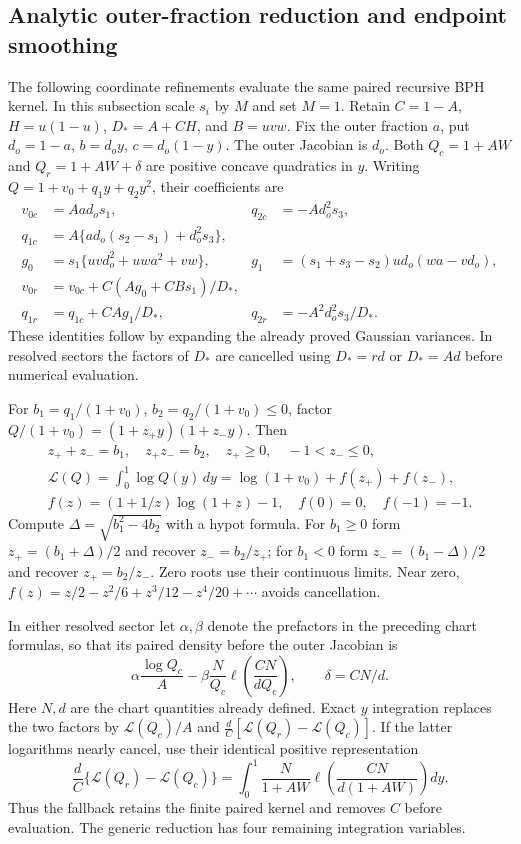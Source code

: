 \subsection{Analytic outer-fraction reduction and endpoint smoothing}
\label{sec:triangle-reduction}

The following coordinate refinements evaluate the same paired recursive BPH
kernel. In this subsection scale $s_i$ by $M$ and set $M=1$. Retain
$C=1-A$, $H=u(1-u)$, $D_*=A+CH$, and $B=uvw$. Fix the outer fraction
$a$, put $d_o=1-a$, $b=d_oy$, $c=d_o(1-y)$. The outer Jacobian is
$d_o$. Both $Q_c=1+AW$ and $Q_r=1+AW+\delta$ are positive concave
quadratics in $y$. Writing $Q=1+v_0+q_1y+q_2y^2$, their coefficients are
\begin{align*}
 v_{0c}&=Aa d_o s_1,& q_{2c}&=-Ad_o^2s_3,\\
 q_{1c}&=A\{a d_o(s_2-s_1)+d_o^2s_3\},&&\\
 g_0&=s_1\{uvd_o^2+uwa^2+vw\},&
 g_1&=(s_1+s_3-s_2)u d_o(wa-vd_o),\\
 v_{0r}&=v_{0c}+C(Ag_0+CBs_1)/D_*,&&\\
 q_{1r}&=q_{1c}+CAg_1/D_*,& q_{2r}&=-A^2d_o^2s_3/D_*.
\end{align*}
These identities follow by expanding the already proved Gaussian variances.
In resolved sectors the factors of $D_*$ are cancelled using $D_*=rd$ or
$D_*=Ad$ before numerical evaluation.

For $b_1=q_1/(1+v_0)$, $b_2=q_2/(1+v_0)\le0$, factor
$Q/(1+v_0)=(1+z_+y)(1+z_-y)$. Then
\begin{gather*}
 z_++z_-=b_1,\quad z_+z_-=b_2,\quad
 z_+\ge0,\quad -1<z_-\le0,\\
 \mathcal L(Q)=\int_0^1\log Q(y)\,dy
   =\log(1+v_0)+f(z_+)+f(z_-),\\
 f(z)=(1+1/z)\log(1+z)-1,\quad f(0)=0,\quad f(-1)=-1.
\end{gather*}
Compute $\Delta=\sqrt{b_1^2-4b_2}$ with a hypot formula. For $b_1\ge0$
form $z_+=(b_1+\Delta)/2$ and recover $z_-=b_2/z_+$; for $b_1<0$
form $z_-=(b_1-\Delta)/2$ and recover $z_+=b_2/z_-$. Zero roots use
their continuous limits. Near zero,
$f(z)=z/2-z^2/6+z^3/12-z^4/20+\cdots$ avoids cancellation.

In either resolved sector let $\alpha,\beta$ denote the prefactors in
the preceding chart formulas, so that its paired density before the outer
Jacobian is
\[
 \alpha\frac{\log Q_c}{A}
 -\beta\frac{N}{Q_c}\ell\left(\frac{CN}{dQ_c}\right),
 \qquad \delta=CN/d.
\]
Here $N,d$ are the chart quantities already defined. Exact $y$ integration
replaces the two factors by $\mathcal L(Q_c)/A$ and
$\frac dC[\mathcal L(Q_r)-\mathcal L(Q_c)]$. If the latter logarithms
nearly cancel, use their identical positive representation
\[
 \frac dC\{\mathcal L(Q_r)-\mathcal L(Q_c)\}
 =\int_0^1\frac{N}{1+AW}
       \ell\left(\frac{CN}{d(1+AW)}\right)dy.
\]
Thus the fallback retains the finite paired kernel and removes $C$ before
evaluation. The generic reduction has four remaining integration variables.


